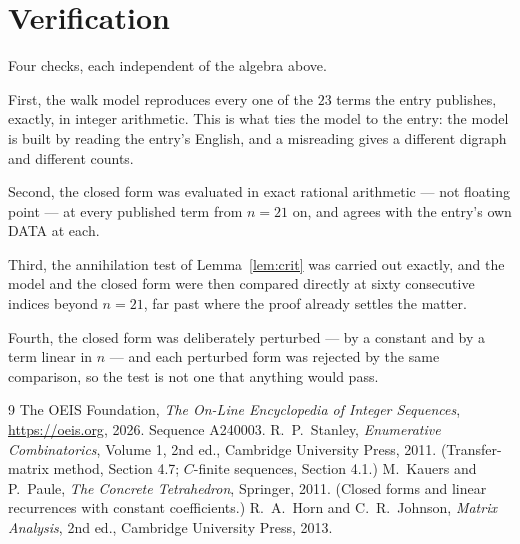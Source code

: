 \documentclass[11pt,a4paper]{article}
\theoremstyle{plain}
\theoremstyle{definition}
\begin{document}
\section{Verification}

Four checks, each independent of the algebra above.

First, the walk model reproduces every one of the $23$ terms the entry publishes,
exactly, in integer arithmetic. This is what ties the model to the entry: the model is built
by reading the entry's English, and a misreading gives a different digraph and different
counts.

Second, the closed form was evaluated in exact rational arithmetic --- not floating point ---
at every published term from $n=21$ on, and agrees with the entry's own DATA at each.

Third, the annihilation test of Lemma~\ref{lem:crit} was carried out exactly, and the model
and the closed form were then compared directly at sixty consecutive indices beyond
$n=21$, far past where the proof already settles the matter.

Fourth, the closed form was deliberately perturbed --- by a constant and by a term linear in
$n$ --- and each perturbed form was rejected by the same comparison, so the test is not one
that anything would pass.

\begin{thebibliography}{9}
 The OEIS Foundation, \emph{The On-Line Encyclopedia of Integer
Sequences}, \url{https://oeis.org}, 2026. Sequence A240003.
 R.~P.~Stanley, \emph{Enumerative Combinatorics}, Volume 1, 2nd ed.,
Cambridge University Press, 2011. (Transfer-matrix method, Section 4.7; $C$-finite sequences,
Section 4.1.)
 M.~Kauers and P.~Paule, \emph{The Concrete Tetrahedron}, Springer, 2011.
(Closed forms and linear recurrences with constant coefficients.)
 R.~A.~Horn and C.~R.~Johnson, \emph{Matrix Analysis}, 2nd ed., Cambridge
University Press, 2013.
\end{thebibliography}
\end{document}
